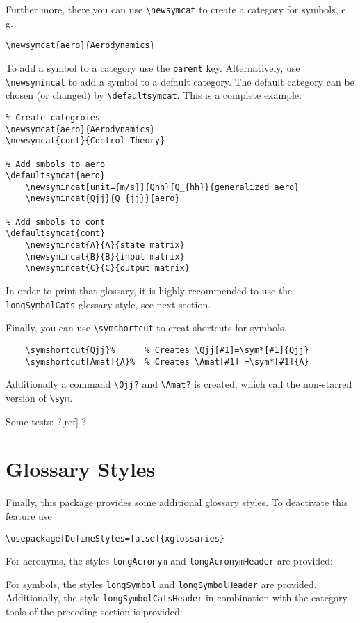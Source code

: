 \documentclass{scrartcl}
\begin{document}
Further more, there you can use \texttt{\textbackslash newsymcat} to create a category for symbols, e.\,g.
\begin{lstlisting}
\newsymcat{aero}{Aerodynamics}
\end{lstlisting}
To add a symbol to a category use the \texttt{parent} key. Alternatively, use \texttt{\textbackslash newsymincat} to add a symbol to a default category. The default category can be chosen (or changed) by \texttt{\textbackslash defaultsymcat}. This is a complete example:
\begin{lstlisting}
% Create categroies
\newsymcat{aero}{Aerodynamics}
\newsymcat{cont}{Control Theory}

% Add smbols to aero
\defaultsymcat{aero}
	\newsymincat[unit={m/s}]{Qhh}{Q_{hh}}{generalized aero}
	\newsymincat{Qjj}{Q_{jj}}{aero}

% Add smbols to cont
\defaultsymcat{cont}
	\newsymincat{A}{A}{state matrix}
	\newsymincat{B}{B}{input matrix}
	\newsymincat{C}{C}{output matrix}
\end{lstlisting}
In order to print that glossary, it is highly recommended to use the \texttt{longSymbolCats} glossary style, see next section.

Finally, you can use \texttt{\textbackslash symshortcut} to creat shortcuts for symbols.
\begin{lstlisting}
	\symshortcut{Qjj}%      % Creates \Qjj[#1]=\sym*[#1]{Qjj}
	\symshortcut[Amat]{A}%  % Creates \Amat[#1] =\sym*[#1]{A}
\end{lstlisting}
Additionally a command \texttt{\textbackslash Qjj?} and \texttt{\textbackslash Amat?} is created, which call the non-starred version of \texttt{\textbackslash sym}.

Some tests: \Qjj \Qjj?[ref] \Amat[ref] \Amat?

%
%
\section{Glossary Styles}
Finally, this package provides some additional glossary styles.  To deactivate this feature use
\begin{lstlisting}
\usepackage[DefineStyles=false]{xglossaries}
\end{lstlisting}

For acronyms, the styles \texttt{longAcronym} and \texttt{longAcronymHeader} are provided:

\bigskip
\printglossary[type=acronym, style=longAcronymHeader]

For symbols, the styles \texttt{longSymbol} and \texttt{longSymbolHeader} are provided. Additionally, the style \texttt{longSymbolCatsHeader} in combination with the category tools of the preceding section is provided:

\bigskip
\printglossary[type=symbol, style=longSymbolCatsHeader]
\end{document}
